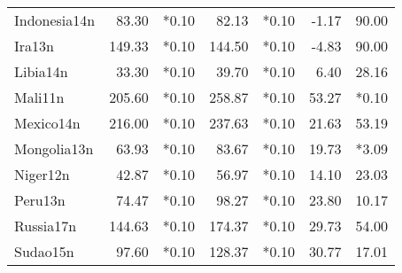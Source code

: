 \begin{landscape}
\begin{table}[htb]
{\begin{tabular}{@{}l|rr|rr|rr@{}}
Indonesia14n&83.30&*0.10&82.13&*0.10&-1.17&90.00\\
Ira13n&149.33&*0.10&144.50&*0.10&-4.83&90.00\\
Libia14n&33.30&*0.10&39.70&*0.10&6.40&28.16\\
Mali11n&205.60&*0.10&258.87&*0.10&53.27&*0.10\\
Mexico14n&216.00&*0.10&237.63&*0.10&21.63&53.19\\
Mongolia13n&63.93&*0.10&83.67&*0.10&19.73&*3.09\\
Niger12n&42.87&*0.10&56.97&*0.10&14.10&23.03\\
Peru13n&74.47&*0.10&98.27&*0.10&23.80&10.17\\
Russia17n&144.63&*0.10&174.37&*0.10&29.73&54.00\\
Sudao15n&97.60&*0.10&128.37&*0.10&30.77&17.01\\
\bottomrule
\end{tabular}
}
\end{table}
\end{landscape}
